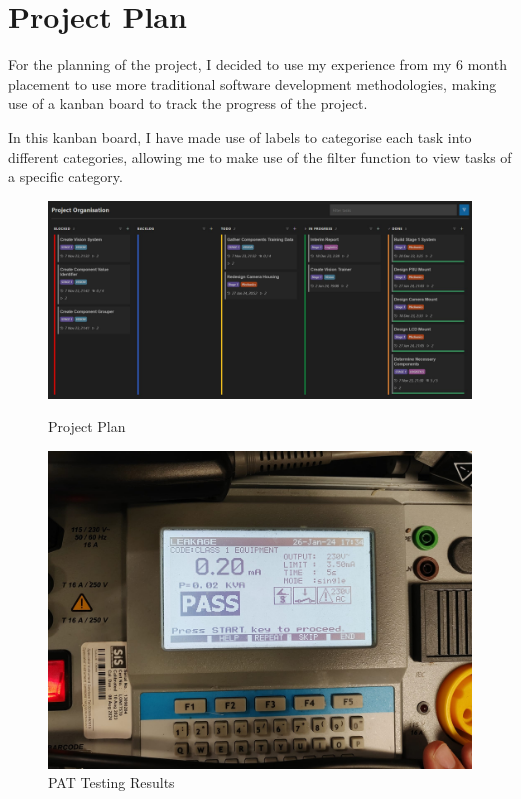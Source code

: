 \section{Project Plan}
\label{sec:projectplan}
For the planning of the project, I decided to use my experience from my 6 month placement to use more traditional software development methodologies,
making use of a kanban board to track the progress of the project.

In this kanban board, I have made use of labels to categorise each task into different categories, allowing me to make use
of the filter function to view tasks of a specific category.

\begin{figure}[t]
    \begin{minipage}[t]{0.45\textwidth}
      \centering
      \includegraphics[width=\textwidth]{imgs/software/projectplan.jpg}
      \caption{Project Plan}
    \end{minipage}
    \hfill
    \begin{minipage}[t]{0.45\textwidth}
        \centering
        \includegraphics[width=\textwidth]{imgs/pattesting.jpeg}
        \caption{PAT Testing Results}
        \label{fig:pat}
      \end{minipage}
      \hfill
\end{figure}

